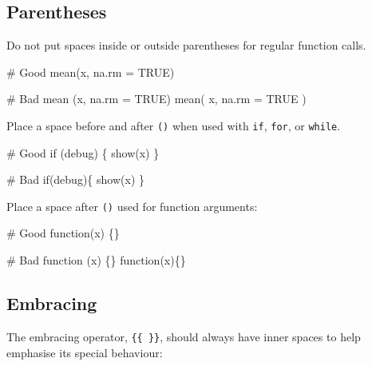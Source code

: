 \documentclass[twoside, pagesize, fontsize=11pt, dvipsnames]{scrreport} %
\newenvironment{Shaded}{\begin{snugshade}}{\end{snugshade}}
\newcommand{\AttributeTok}[1]{\textcolor[rgb]{0.40,0.45,0.13}{#1}}
\newcommand{\CommentTok}[1]{\textcolor[rgb]{0.37,0.37,0.37}{#1}}
\newcommand{\ConstantTok}[1]{\textcolor[rgb]{0.56,0.35,0.01}{#1}}
\newcommand{\ControlFlowTok}[1]{\textcolor[rgb]{0.00,0.23,0.31}{#1}}
\newcommand{\FunctionTok}[1]{\textcolor[rgb]{0.28,0.35,0.67}{#1}}
\newcommand{\NormalTok}[1]{\textcolor[rgb]{0.00,0.23,0.31}{#1}}
\begin{document}
\hypertarget{parentheses}{%
\subsection{Parentheses}\label{parentheses}}

Do not put spaces inside or outside parentheses for regular function
calls.

\begin{Shaded}
\begin{Highlighting}[]
\CommentTok{\# Good}
\FunctionTok{mean}\NormalTok{(x, }\AttributeTok{na.rm =} \ConstantTok{TRUE}\NormalTok{)}

\CommentTok{\# Bad}
\FunctionTok{mean}\NormalTok{ (x, }\AttributeTok{na.rm =} \ConstantTok{TRUE}\NormalTok{)}
\FunctionTok{mean}\NormalTok{( x, }\AttributeTok{na.rm =} \ConstantTok{TRUE}\NormalTok{ )}
\end{Highlighting}
\end{Shaded}

Place a space before and after \texttt{()} when used with \texttt{if},
\texttt{for}, or \texttt{while}.

\begin{Shaded}
\begin{Highlighting}[]
\CommentTok{\# Good}
\ControlFlowTok{if}\NormalTok{ (debug) \{}
  \FunctionTok{show}\NormalTok{(x)}
\NormalTok{\}}

\CommentTok{\# Bad}
\ControlFlowTok{if}\NormalTok{(debug)\{}
  \FunctionTok{show}\NormalTok{(x)}
\NormalTok{\}}
\end{Highlighting}
\end{Shaded}

Place a space after \texttt{()} used for function arguments:

\begin{Shaded}
\begin{Highlighting}[]
\CommentTok{\# Good}
\ControlFlowTok{function}\NormalTok{(x) \{\}}

\CommentTok{\# Bad}
\ControlFlowTok{function}\NormalTok{ (x) \{\}}
\ControlFlowTok{function}\NormalTok{(x)\{\}}
\end{Highlighting}
\end{Shaded}

\hypertarget{embracing}{%
\subsection{Embracing}\label{embracing}}

The embracing operator, \texttt{\{\{\ \}\}}, should always have inner
spaces to help emphasise its special behaviour:
\end{document}
